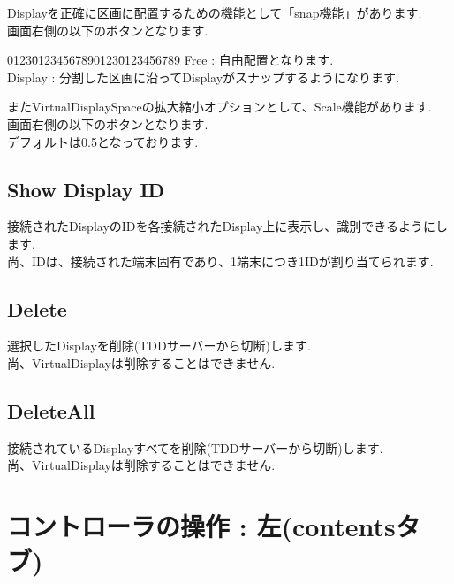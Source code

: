 \documentclass[a4paper,10pt,oneside]{jsbook}
\begin{document}
Displayを正確に区画に配置するための機能として「snap機能」があります.\\
画面右側の以下のボタンとなります.\\

\begin{tabbing}
0123\=01234567890123\=0123456789\kill
\>Free    \> : 自由配置となります.\\
\>Display \> : 分割した区画に沿ってDisplayがスナップするようになります.
\end{tabbing}

またVirtualDisplaySpaceの拡大縮小オプションとして、Scale機能があります.\\
画面右側の以下のボタンとなります.\\
デフォルトは0.5となっております.\\

\subsection{Show Display ID}
接続されたDisplayのIDを各接続されたDisplay上に表示し、識別できるようにします.\\
尚、IDは、接続された端末固有であり、1端末につき1IDが割り当てられます.\\

\subsection{Delete}
選択したDisplayを削除(TDDサーバーから切断)します.\\
尚、VirtualDisplayは削除することはできません.\\



\subsection{DeleteAll}
接続されているDisplayすべてを削除(TDDサーバーから切断)します.\\
尚、VirtualDisplayは削除することはできません.\\

\newpage

\section{コントローラの操作 : 左(contentsタブ)}
\end{document}
